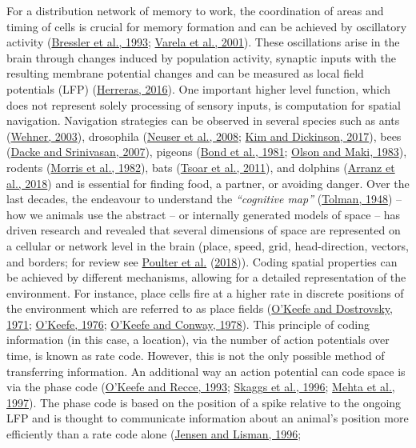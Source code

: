 \documentclass[
  12pt,
  a4paper,
  openany]{book}
\begin{document}
For a distribution network of memory to work, the coordination of areas and timing of cells is crucial for memory formation and can be achieved by oscillatory activity (\protect\hyperlink{ref-bressler_episodic_1993}{Bressler et al., 1993}; \protect\hyperlink{ref-varela_brainweb_2001}{Varela et al., 2001}). These oscillations arise in the brain through changes induced by population activity, synaptic inputs with the resulting membrane potential changes and can be measured as local field potentials (LFP) (\protect\hyperlink{ref-herreras_local_2016}{Herreras, 2016}). One important higher level function, which does not represent solely processing of sensory inputs, is computation for spatial navigation. Navigation strategies can be observed in several species such as ants (\protect\hyperlink{ref-wehner_desert_2003}{Wehner, 2003}), drosophila (\protect\hyperlink{ref-neuser_analysis_2008}{Neuser et al., 2008}; \protect\hyperlink{ref-kim_idiothetic_2017}{Kim and Dickinson, 2017}), bees (\protect\hyperlink{ref-dacke_honeybee_2007}{Dacke and Srinivasan, 2007}), pigeons (\protect\hyperlink{ref-bond_spatial_1981}{Bond et al., 1981}; \protect\hyperlink{ref-olson_characteristics_1983}{Olson and Maki, 1983}), rodents (\protect\hyperlink{ref-morris_place_1982}{Morris et al., 1982}), bats (\protect\hyperlink{ref-tsoar_large-scale_2011}{Tsoar et al., 2011}), and dolphins (\protect\hyperlink{ref-arranz_rissos_2018}{Arranz et al., 2018}) and is essential for finding food, a partner, or avoiding danger. Over the last decades, the endeavour to understand the \emph{``cognitive map''} (\protect\hyperlink{ref-tolman_cognitive_1948}{Tolman, 1948}) -- how we animals use the abstract -- or internally generated models of space -- has driven research and revealed that several dimensions of space are represented on a cellular or network level in the brain (place, speed, grid, head-direction, vectors, and borders; for review see \protect\hyperlink{ref-poulter_neurobiology_2018}{Poulter et al.} (\protect\hyperlink{ref-poulter_neurobiology_2018}{2018})). Coding spatial properties can be achieved by different mechanisms, allowing for a detailed representation of the environment. For instance, place cells fire at a higher rate in discrete positions of the environment which are referred to as place fields (\protect\hyperlink{ref-okeefe_hippocampus_1971}{O'Keefe and Dostrovsky, 1971}; \protect\hyperlink{ref-okeefe_place_1976}{O'Keefe, 1976}; \protect\hyperlink{ref-okeefe_hippocampal_1978}{O'Keefe and Conway, 1978}). This principle of coding information (in this case, a location), via the number of action potentials over time, is known as rate code. However, this is not the only possible method of transferring information. An additional way an action potential can code space is via the phase code (\protect\hyperlink{ref-okeefe_phase_1993}{O'Keefe and Recce, 1993}; \protect\hyperlink{ref-skaggs_theta_1996}{Skaggs et al., 1996}; \protect\hyperlink{ref-mehta_experience-dependent_1997}{Mehta et al., 1997}). The phase code is based on the position of a spike relative to the ongoing LFP and is thought to communicate information about an animal's position more efficiently than a rate code alone (\protect\hyperlink{ref-jensen_hippocampal_1996}{Jensen and Lisman, 1996}; 
\end{document}
